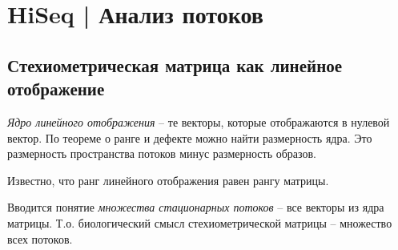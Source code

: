 \documentclass[main.tex]{subfiles}
\begin{document}
	
\section{ HiSeq | Анализ потоков }

\subsection{Стехиометрическая матрица как линейное отображение}


\emph{Ядро линейного отображения } -- те векторы, которые отображаются в нулевой вектор.
По теореме о ранге и дефекте можно найти размерность ядра.
Это размерность пространства потоков минус размерность образов.

Известно, что ранг линейного отображения равен рангу матрицы. 

Вводится понятие \emph{множества стационарных потоков} -- все векторы из ядра матрицы.
Т.о. биологический смысл стехиометрической матрицы -- множество всех потоков.
	
\end{document}

